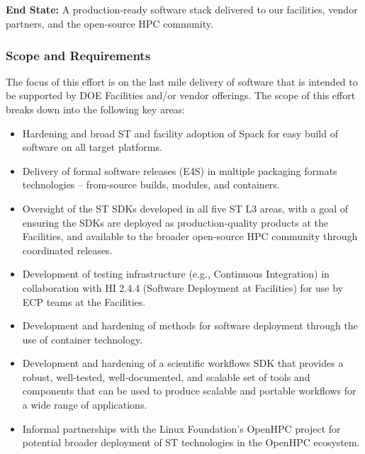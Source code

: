 \subsection{ \ecosystem}\label{subsect:ecosystem}

\textbf{End State:} A production-ready software stack delivered to our facilities, vendor partners, and the open-source HPC community.

\subsubsection{Scope and Requirements}
The focus of this effort is on the last mile delivery of software that is intended to be supported by DOE Facilities and/or vendor offerings. The scope of this effort breaks down into the following key areas:
\begin{itemize}
	\item Hardening and broad ST and facility adoption of Spack for easy build of software on all target platforms.
        \item Delivery of formal software releases (E4S) in multiple packaging formats technologies -- from-source builds, modules, and containers.
	\item Oversight of the ST SDKs developed in all five ST L3 areas, with a goal of ensuring the SDKs are deployed as production-quality products at the Facilities, and available to the broader open-source HPC community through coordinated releases.
	\item Development of testing infrastructure (e.g., Continuous Integration) in collaboration with HI 2.4.4 (Software Deployment at Facilities) for use by ECP teams at the Facilities.
	\item Development and hardening of methods for software deployment through the use of container technology.
	\item Development and hardening of a scientific workflows SDK that provides a robust, well-tested, well-documented, and scalable set of tools and components that can be used to produce scalable and portable workflows for a wide range of applications.
	\item Informal partnerships with the Linux Foundation's OpenHPC project for potential broader deployment of ST technologies in the OpenHPC ecosystem.
\end{itemize}

